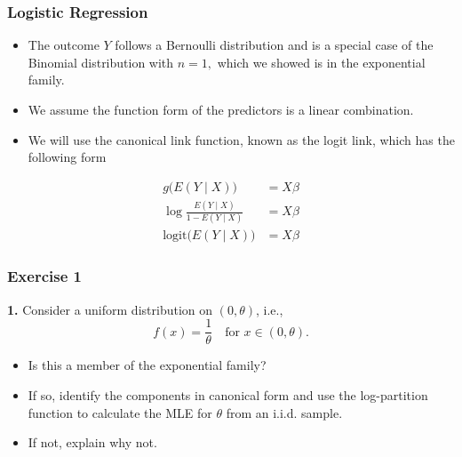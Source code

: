 \documentclass{beamer}
\begin{document}
\begin{frame}
\frametitle{Logistic Regression}

\begin{itemize}
\item The outcome $Y$ follows a Bernoulli distribution and is a special case of the Binomial distribution with $n=1,$ which we showed is in the exponential family.
\item We assume the function form of the predictors is a linear combination. 
\item We will use the canonical link function, known as the logit link, which has the following form
\end{itemize}

\begin{align}
g \Big( E(Y \mid X) \Big) &= X \beta \\
\log \frac{E(Y \mid X)}{1 - E(Y \mid X)} &= X\beta \\
 \text{logit} \Big( E(Y \mid X) \Big) &= X \beta
\end{align}

\end{frame}



%

\begin{frame}
\frametitle{Exercise 1}
\textbf{1.} Consider a uniform distribution on $(0,\theta)$, i.e., 
\[
f(x)=\frac{1}{\theta}\quad\text{for } x\in (0,\theta).
\]
\begin{itemize}
  \item Is this a member of the exponential family?
  \item If so, identify the components in canonical form and use the log-partition function to calculate the MLE for $\theta$ from an i.i.d. sample.
  \item If not, explain why not.
\end{itemize}
\end{frame}
\end{document}
